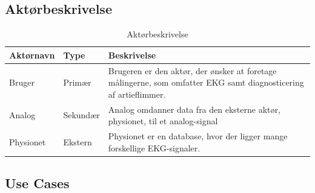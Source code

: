 \subsection{Aktørbeskrivelse}

\begin{table}[H]
\begin{tabularx}{\textwidth}{l l X}
     Aktørnavn  & Type      & Beskrivelse \\ \midrule
     Bruger   & Primær    & Brugeren er den aktør, der ønsker at foretage målingerne, som omfatter EKG samt diagnosticering af artieflimmer.\\ 						  									  \addlinespace[2mm]
     Analog & Sekundær  & Analog omdanner data fra den eksterne aktør, physionet, til et analog-signal \\ 
     	\addlinespace[2mm]
     Physionet & Ekstern 	& Physionet er en database, hvor der ligger mange forskellige EKG-signaler.  \\	                                                                                                                                                                           
   
     \bottomrule                                                                                                                   
    \end{tabularx}
    \caption {Aktørbeskrivelse}
    \label{tab:aktoerbeskrivelse}
	
\end{table}

\subsection{Use Cases}

